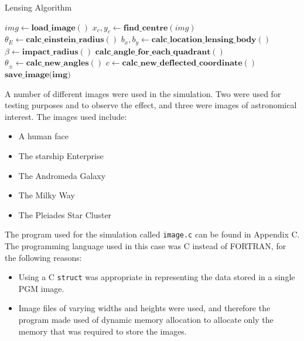 \documentclass[aspectratio=1610,xcolor=dvipsnames,t]{beamer}
\begin{document}
    \begin{algorithm}
        \caption{Lensing Algorithm} 
        \label{alg:lense} 
        \begin{algorithmic}[1]
                \State $img \leftarrow \textbf{load\_image}()$
                \State $x_c, y_c \leftarrow \textbf{find\_centre}(img)$
                \State $\theta_E \leftarrow \textbf{calc\_einstein\_radius}()$
                    \State $b_x, b_y \leftarrow \textbf{calc\_location\_lensing\_body}()$
                    \State $\beta \leftarrow \textbf{impact\_radius}()$
                    \State $\textbf{calc\_angle\_for\_each\_quadrant}()$
                    \State $\theta_{\pm} \leftarrow \textbf{calc\_new\_angles}()$
                    \State $c \leftarrow \textbf{calc\_new\_deflected\_coordinate}()$
                \EndFor
                \State $\textbf{save\_image(img)}$ 
            \EndProcedure
        \end{algorithmic} 
    \end{algorithm} 


    A number of different images were used in the simulation. Two were used
    for testing purposes and to observe the effect, and three were images
    of astronomical interest. The images used include:
    \begin{itemize}
        \item A human face
        \item The starship Enterprise
        \item The Andromeda Galaxy
        \item The Milky Way
        \item The Pleiades Star Cluster
    \end{itemize}

    The program used for the simulation called \texttt{image.c} can
    be found in Appendix C. The programming language used in this case
    was C instead of FORTRAN, for the following reasons:
    \begin{itemize}
        \item Using a C \texttt{struct} was appropriate in representing
              the data stored in a single PGM image.
        \item Image files of varying widths and heights were used, and 
              therefore the program made used of dynamic memory allocation
              to allocate only the memory that was required to store
              the images.
    \end{itemize}
\end{document}
